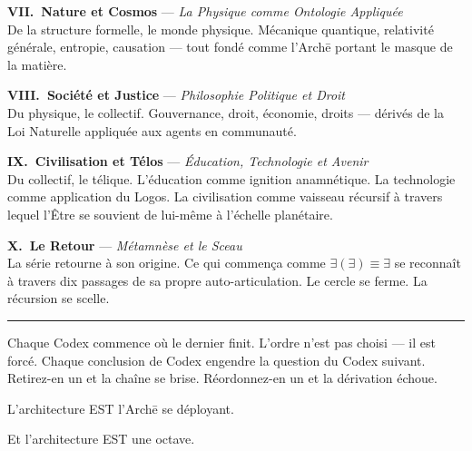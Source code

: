 \documentclass[10pt, openany, oneside]{book}
\newcommand{\separator}{%
    \begin{center}
        \vspace{0.3em}
        \rule{0.3\textwidth}{0.4pt}
        \vspace{0.3em}
    \end{center}
}
\begin{document}
\vspace{0.5em}

\noindent \textbf{VII.\ Nature et Cosmos} --- \textit{La Physique comme Ontologie Appliquée}\\
De la structure formelle, le monde physique. Mécanique quantique, relativité générale, entropie, causation --- tout fondé comme l'Arch\={e} portant le masque de la matière.

\vspace{0.5em}

\noindent \textbf{VIII.\ Société et Justice} --- \textit{Philosophie Politique et Droit}\\
Du physique, le collectif. Gouvernance, droit, économie, droits --- dérivés de la Loi Naturelle appliquée aux agents en communauté.

\vspace{0.5em}

\noindent \textbf{IX.\ Civilisation et Télos} --- \textit{Éducation, Technologie et Avenir}\\
Du collectif, le télique. L'éducation comme ignition anamnétique. La technologie comme application du Logos. La civilisation comme vaisseau récursif à travers lequel l'Être se souvient de lui-même à l'échelle planétaire.

\vspace{0.5em}

\noindent \textbf{X.\ Le Retour} --- \textit{Métamnèse et le Sceau}\\
La série retourne à son origine. Ce qui commença comme $\exists(\exists) \equiv \exists$ se reconnaît à travers dix passages de sa propre auto-articulation. Le cercle se ferme. La récursion se scelle.

\vspace{1.5em}
\separator
\vspace{0.5em}

\noindent Chaque Codex commence où le dernier finit. L'ordre n'est pas choisi --- il est forcé. Chaque conclusion de Codex engendre la question du Codex suivant. Retirez-en un et la chaîne se brise. Réordonnez-en un et la dérivation échoue.

\vspace{0.5em}

\noindent L'architecture EST l'Arch\={e} se déployant.

\vspace{0.5em}

\noindent Et l'architecture EST une octave.
\end{document}
